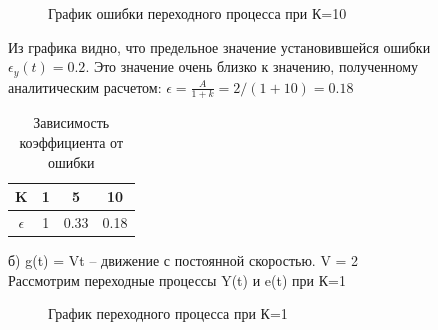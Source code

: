 \documentclass[a4paper, 11pt]{article}
\begin{document}
\newpage 

\begin{figure}[h!]
    \caption{График ошибки переходного процесса при К=10}
    \label{tree}
\end{figure}

\normalsize{Из графика видно, что предельное значение установившейся ошибки $\epsilon_y(t)=0.2$.
Это значение очень близко к значению, полученному аналитическим расчетом: $\epsilon=\frac {A}{1+k} = 2/(1+10) = 0.18$}

\begin{table}[h]
    \begin{center}
    \begin{tabular}{|c|c|c|c|}
    \hline
         K & 1 & 5 & 10 \\
         \hline
         $\epsilon$ & 1 & 0.33 & 0.18 \\
    \hline     
    \end{tabular}
    \caption{Зависимость коэффициента от ошибки}
    \label{tab:my_label}
    \end{center}
\end{table}

б) g(t) = Vt – движение с постоянной скоростью. V = 2\\

Рассмотрим переходные процессы Y(t) и e(t) при К=1

\begin{figure}[h!]
    \caption{График переходного процесса при К=1}
    \label{four}
\end{figure}
\end{document}
